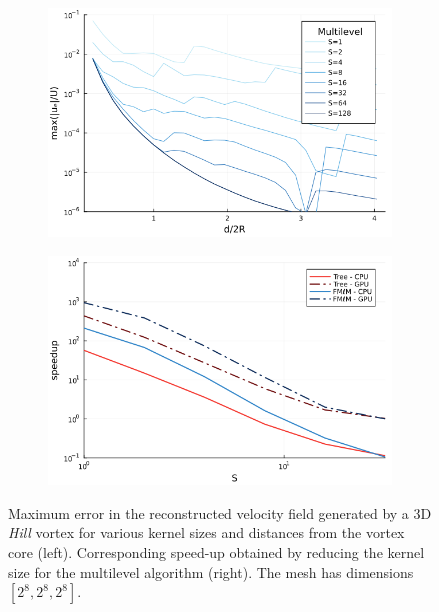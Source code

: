 \documentclass[final,1p,times]{elsarticle}
\begin{document}
\begin{figure}
    \centering
    \begin{subfigure}{.5\textwidth}
        \centering
        \includegraphics[width=\textwidth]{tex//fig/Hill_error_dists.png}
    \end{subfigure}%
    \begin{subfigure}{.5\textwidth}
        \centering
        \includegraphics[width=\textwidth]{tex/fig/Hill_speedup_dists.png}
    \end{subfigure}
    \caption{Maximum error in the reconstructed velocity field generated by a 3D \emph{Hill} vortex for various kernel sizes and distances from the vortex core (left). Corresponding speed-up obtained by reducing the kernel size for the multilevel algorithm (right). The mesh has dimensions $[2^8,2^8,2^8]$.}
    \label{fig:error_hill_3}
\end{figure}
\end{document}
